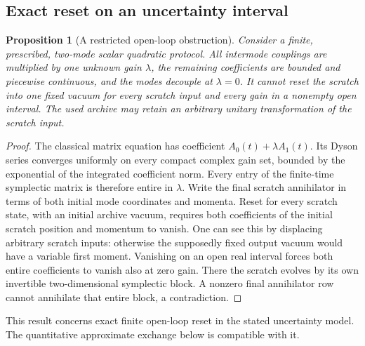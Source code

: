 \documentclass[11pt]{article}
\numberwithin{equation}{section}
\newtheorem{proposition}[theorem]{Proposition}
\theoremstyle{definition}
\theoremstyle{remark}
\begin{document}
\subsection{Exact reset on an uncertainty interval}
\begin{proposition}[A restricted open-loop obstruction]
\label{p2s:prop:analytic}
Consider a finite, prescribed, two-mode scalar quadratic protocol. All
intermode couplings are multiplied by one unknown gain $\lambda$, the
remaining coefficients are bounded and piecewise continuous, and the
modes decouple at $\lambda=0$. It cannot reset the scratch into one fixed
vacuum for every scratch input and every gain in a nonempty open interval.
The used archive may retain an arbitrary unitary transformation of the
scratch input.
\end{proposition}
\begin{proof}
The classical matrix equation has coefficient $A_0(t)+\lambda A_1(t)$.
Its Dyson series converges uniformly on every compact complex gain set,
bounded by the exponential of the integrated coefficient norm. Every
entry of the finite-time symplectic matrix is therefore entire in
$\lambda$. Write the final scratch annihilator in terms of both initial
mode coordinates and momenta. Reset for every scratch state, with an
initial archive vacuum, requires both coefficients of the initial scratch
position and momentum to vanish. One can see this by displacing arbitrary
scratch inputs: otherwise the supposedly fixed output vacuum would have
a variable first moment. Vanishing on an open real interval forces both
entire coefficients to vanish also at zero gain. There the scratch evolves
by its own invertible two-dimensional symplectic block. A nonzero final
annihilator row cannot annihilate that entire block, a contradiction.
\end{proof}
This result concerns exact finite open-loop reset in the stated uncertainty
model. The quantitative approximate exchange below is compatible with it.
\end{document}
